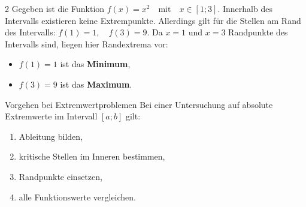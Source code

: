    \begin{bsp}{}{}
   \begin{multicols}{2}
       Gegeben ist die Funktion \(
f(x)=x^2 \quad \text{mit} \quad x\in[1;3]\). Innerhalb des Intervalls existieren keine Extrempunkte. Allerdings gilt für die Stellen am Rand des Intervalls:
\(f(1)=1, \quad f(3)=9\). Da \(x=1\) und \(x=3\) Randpunkte des Intervalls sind, liegen hier Randextrema vor:
\begin{itemize}[leftmargin=1.5em]
    \item \(f(1)=1\) ist das \textbf{Minimum},
    \item \(f(3)=9\) ist das \textbf{Maximum}.
\end{itemize}

   \begin{b8d}{Vorgehen bei Extremwertproblemen}{}
Bei einer Untersuchung auf absolute Extremwerte im Intervall \( [a;b] \) gilt:
\begin{enumerate}[leftmargin=1.5em]
    \item Ableitung bilden,
    \item kritische Stellen im Inneren bestimmen,
    \item Randpunkte einsetzen,
    \item alle Funktionswerte vergleichen.
\end{enumerate}
   \end{b8d}
\begin{center}
\end{center}
\end{multicols}
   \end{bsp}
